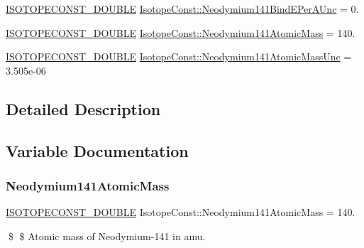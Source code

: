 \begin{DoxyCompactItemize}
\mbox{\hyperlink{group___isotope_const-_macros_ga8f45a7272ce02c0b4c65c44636ed719a}{I\+S\+O\+T\+O\+P\+E\+C\+O\+N\+S\+T\+\_\+\+D\+O\+U\+B\+LE}} \mbox{\hyperlink{group___isotope_const-_neodymium-_nd141_ga716441acd132dc83a540920d15f9719d}{Isotope\+Const\+::\+Neodymium141\+Bind\+E\+Per\+A\+Unc}} = 0.
\item 
\mbox{\hyperlink{group___isotope_const-_macros_ga8f45a7272ce02c0b4c65c44636ed719a}{I\+S\+O\+T\+O\+P\+E\+C\+O\+N\+S\+T\+\_\+\+D\+O\+U\+B\+LE}} \mbox{\hyperlink{group___isotope_const-_neodymium-_nd141_ga84f26f0fe87a4405fa9e0197575fda77}{Isotope\+Const\+::\+Neodymium141\+Atomic\+Mass}} = 140.
\item 
\mbox{\hyperlink{group___isotope_const-_macros_ga8f45a7272ce02c0b4c65c44636ed719a}{I\+S\+O\+T\+O\+P\+E\+C\+O\+N\+S\+T\+\_\+\+D\+O\+U\+B\+LE}} \mbox{\hyperlink{group___isotope_const-_neodymium-_nd141_gad6cbe210bdb12c78b6b07a4d0cda1e59}{Isotope\+Const\+::\+Neodymium141\+Atomic\+Mass\+Unc}} = 3.\+505e-\/06
\end{DoxyCompactItemize}


\subsection{Detailed Description}


\subsection{Variable Documentation}
\mbox{\label{group___isotope_const-_neodymium-_nd141_ga84f26f0fe87a4405fa9e0197575fda77}} 
\subsubsection{\texorpdfstring{Neodymium141\+Atomic\+Mass}{Neodymium141AtomicMass}}
{\footnotesize\ttfamily \mbox{\hyperlink{group___isotope_const-_macros_ga8f45a7272ce02c0b4c65c44636ed719a}{I\+S\+O\+T\+O\+P\+E\+C\+O\+N\+S\+T\+\_\+\+D\+O\+U\+B\+LE}} Isotope\+Const\+::\+Neodymium141\+Atomic\+Mass = 140.}

\$ \$ Atomic mass of Neodymium-\/141 in amu. \mbox{\label{group___isotope_const-_neodymium-_nd141_gad6cbe210bdb12c78b6b07a4d0cda1e59}} 

